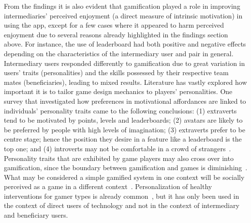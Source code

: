 From the findings it is also evident that gamification played a role in improving intermediaries' perceived enjoyment (a direct measure of intrinsic motivation) in using the app, except for a few cases where it appeared to harm  perceived enjoyment due to several reasons already highlighted in the findings section above. For instance, the use of leaderboard had both positive and negative effects depending on the characteristics of the intermediary user and pair in general. Intermediary users responded differently to gamification due to great variation in users' traits (personalities) and the skills possessed by their respective team mates (beneficiaries), leading to mixed results. Literature has vastly explored how important it is to tailor game design mechanics to players' personalities. One survey that investigated how preferences in motivational affordances are linked to individuals' personality traits came to the following conclusions: (1) extraverts tend to be motivated by points, levels and leaderboards; (2) avatars are likely to be preferred by people with high levels of imagination; (3) extraverts prefer to be centre stage; hence the position they desire in a feature like a leaderboard is the top one; and (4) introverts may not be comfortable in a crowd of strangers~\citep{jia2016personality}. Personality traits that are exhibited by game players may also cross over into gamification, since the boundary between gamification and games is diminishing~\citep{ferro2013towards}. What may be considered a simple gamified system in one context will be socially perceived as a game in a different context~\citep{deterding2011game}. Personalization of healthy interventions for gamer types  is already common~\citep{arteaga2010:persuasive,orji2013:tailoring}, but it has only been used in the context of direct users of technology and not in the context of intermediary and beneficiary users.

